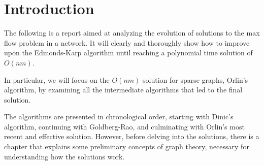 
\chapter*{Introduction} 


The following is a report aimed at analyzing the evolution of solutions to the max flow problem in a network. It will clearly and thoroughly show how to improve upon the Edmonds-Karp algorithm until reaching a polynomial time solution of $O(nm)$.

In particular, we will focus on the $O(nm)$ solution for sparse graphs, Orlin's algorithm, by examining all the intermediate algorithms that led to the final solution.

The algorithms are presented in chronological order, starting with Dinic's algorithm, continuing with Goldberg-Rao, and culminating with Orlin's most recent and effective solution. However, before delving into the solutions, there is a chapter that explains some preliminary concepts of graph theory, necessary for understanding how the solutions work.

\cleardoublepage